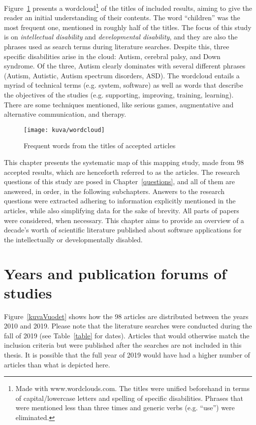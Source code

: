 \documentclass[utf8,english]{gradu3}
\begin{document}
Figure~\ref{kuvaOtsikot} presents a wordcloud\footnote[2]{Made with www.wordclouds.com. The titles were
  unified beforehand  in terms of capital/lowercase letters and spelling of specific disabilities. Phrases that were
  mentioned less than three times and generic verbs (e.g. ``use'') were eliminated.} of the titles of included results,
aiming to give the reader an initial understanding of their contents.
The word ``children'' was the most frequent one, mentioned in roughly half of the titles.
The focus of this study is on \textit{intellectual disability} and \textit{developmental disability},
and they are also the phrases used as search terms during literature searches.
Despite this, three specific disabilities arise in the cloud: Autism, cerebral palsy, and Down syndrome.
Of the three, Autism clearly dominates with several different phrases (Autism, Autistic, Autism spectrum disorders, ASD).
The wordcloud entails a myriad of technical terms (e.g. system, software) as well as words
that describe the objectives of the studies (e.g. supporting, improving, training, learning).
There are some techniques mentioned, like serious games,
augmentative and alternative communication, and therapy.

\begin{figure}[h]\centering
  \texttt{[image: kuva/wordcloud]}
  \caption{Frequent words from the titles of accepted articles}
  \label{kuvaOtsikot}
\end{figure}

This chapter presents the systematic map of this mapping study, made from 98
accepted results, which are henceforth referred to as the articles.
The research questions of this study are posed in Chapter~\ref{questions}, and
all of them are answered, in order, in the following subchapters.
Answers to the research questions were extracted adhering to information
explicitly mentioned in the articles, while also simplifying data for the sake of brevity.
All parts of papers were considered, when necessary.
This chapter aims to provide an overview of a decade's worth of scientific literature
published about software applications for the intellectually or developmentally disabled.


\section{Years and publication forums of studies} %

Figure~\ref{kuvaVuodet} shows how the 98 articles are distributed between the years 2010 and 2019.
Please note that the literature searches were conducted during the fall of 2019 (see Table~\ref{table} for dates).
Articles that would otherwise match the inclusion criteria but were published after the searches
are not included in this thesis. It is possible that the full year of 2019 would have had
a higher number of articles than what is depicted here.
\end{document}
